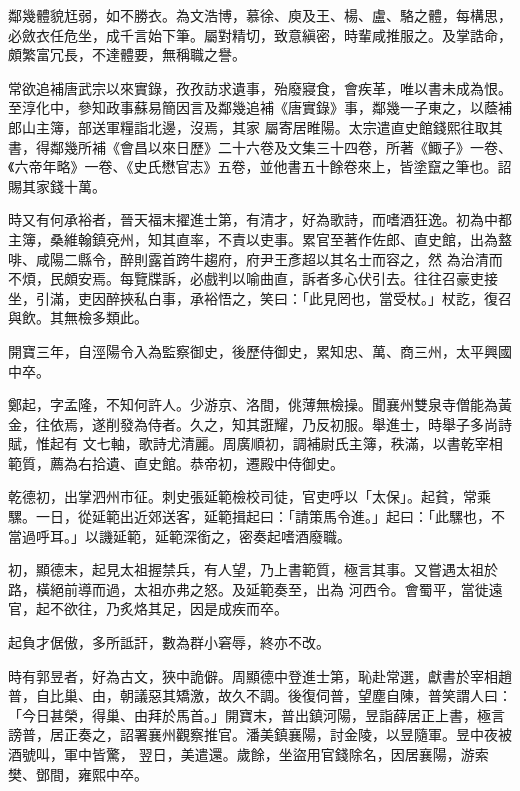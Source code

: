 \begin{pinyinscope}
 鄰幾體貌尪弱，如不勝衣。為文浩博，慕徐、庾及王、楊、盧、駱之體，每構思，必斂衣任危坐，成千言始下筆。屬對精切，致意縝密，時輩咸推服之。及掌誥命，頗繁富冗長，不達體要，無稱職之譽。



 常欲追補唐武宗以來實錄，孜孜訪求遺事，殆廢寢食，會疾革，唯以書未成為恨。至淳化中，參知政事蘇易簡因言及鄰幾追補《唐實錄》事，鄰幾一子東之，以蔭補郎山主簿，部送軍糧詣北邊，沒焉，其家
 屬寄居睢陽。太宗遣直史館錢熙往取其書，得鄰幾所補《會昌以來日歷》二十六卷及文集三十四卷，所著《鯫子》一卷、《六帝年略》一卷、《史氏懋官志》五卷，並他書五十餘卷來上，皆塗竄之筆也。詔賜其家錢十萬。



 時又有何承裕者，晉天福末擢進士第，有清才，好為歌詩，而嗜酒狂逸。初為中都主簿，桑維翰鎮兗州，知其直率，不責以吏事。累官至著作佐郎、直史館，出為盩啡、咸陽二縣令，醉則露首跨牛趨府，府尹王彥超以其名士而容之，然
 為治清而不煩，民頗安焉。每覽牒訴，必戲判以喻曲直，訴者多心伏引去。往往召豪吏接坐，引滿，吏因醉挾私白事，承裕悟之，笑曰：「此見罔也，當受杖。」杖訖，復召與飲。其無檢多類此。



 開寶三年，自涇陽令入為監察御史，後歷侍御史，累知忠、萬、商三州，太平興國中卒。



 鄭起，字孟隆，不知何許人。少游京、洛間，佻薄無檢操。聞襄州雙泉寺僧能為黃金，往依焉，遂削發為侍者。久之，知其誑耀，乃反初服。舉進士，時舉子多尚詩賦，惟起有
 文七軸，歌詩尤清麗。周廣順初，調補尉氏主簿，秩滿，以書乾宰相範質，薦為右拾遺、直史館。恭帝初，遷殿中侍御史。



 乾德初，出掌泗州市征。刺史張延範檢校司徒，官吏呼以「太保」。起貧，常乘騾。一日，從延範出近郊送客，延範揖起曰：「請策馬令進。」起曰：「此騾也，不當過呼耳。」以譏延範，延範深銜之，密奏起嗜酒廢職。



 初，顯德末，起見太祖握禁兵，有人望，乃上書範質，極言其事。又嘗遇太祖於路，橫絕前導而過，太祖亦弗之怒。及延範奏至，出為
 河西令。會蜀平，當徙遠官，起不欲往，乃炙烙其足，因是成疾而卒。



 起負才倨傲，多所詆訐，數為群小窘辱，終亦不改。



 時有郭昱者，好為古文，狹中詭僻。周顯德中登進士第，恥赴常選，獻書於宰相趙普，自比巢、由，朝議惡其矯激，故久不調。後復伺普，望塵自陳，普笑謂人曰：「今日甚榮，得巢、由拜於馬首。」開寶末，普出鎮河陽，昱詣薛居正上書，極言謗普，居正奏之，詔署襄州觀察推官。潘美鎮襄陽，討金陵，以昱隨軍。昱中夜被酒號叫，軍中皆驚，
 翌日，美遣還。歲餘，坐盜用官錢除名，因居襄陽，游索樊、鄧間，雍熙中卒。




\end{pinyinscope}
